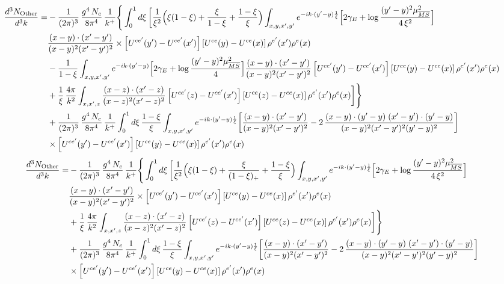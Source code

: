 \documentclass[9pt]{article}
\numberwithin{equation}{section}
\begin{document}
\begin{align}
\frac{d^{3}N_{\rm Other}}{d^{3}k}= &-\frac{1}{(2\pi)^{3}}\,\frac{g^{4}\,N_{c}}{8\pi^{4}}\,\frac{1}{k^{+}}\Bigg\{\int_{0}^{1}d\xi\,\bigg[\frac{1}{\xi^{2}}\Big(\xi(1-\xi)+\frac{\xi}{1-\xi}+\frac{1-\xi}{\xi}\Big)\int_{x,y,x',y'}e^{-ik\cdot(y'-y)\frac{1}{\xi}}\Big[2\gamma_{E}+\log\frac{(y'-y)^{2}\mu^{2}_{\overline{MS}}}{4\,\xi^{2}}\Big]\notag \\ & \frac{(x-y)\cdot(x'-y')}{(x-y)^{2}(x'-y')^{2}}\times\left[U^{ce'}(y') - U^{ce'}(x')\right]\left[U^{ce}(y) - U^{ce}(x)\right]\rho^{e'}(x')\rho^{e}(x)\notag\\
&-\frac{1}{1-\xi}\int_{x,y,x',y'}e^{-ik\cdot(y'-y)}\Big[2\gamma_{E}+\log\frac{(y'-y)^{2}\mu^{2}_{\overline{MS}}}{4}\Big]\frac{(x-y)\cdot(x'-y')}{(x-y)^{2}(x'-y')^{2}}\left[U^{ce'}(y') - U^{ce'}(x')\right]\left[U^{ce}(y) - U^{ce}(x)\right]\rho^{e'}(x')\rho^{e}(x)\notag\\
&+\frac{1}{\xi}\,\frac{4\pi}{k^{2}}\int_{x,x',z}\frac{(x-z)\cdot(x'-z)}{(x-z)^{2}(x'-z)^{2}}\left[U^{ce'}(z) - U^{ce'}(x')\right]\left[U^{ce}(z) - U^{ce}(x)\right]\rho^{e'}(x')\rho^{e}(x)\bigg]\Bigg\}\notag\\
&+\frac{1}{(2\pi)^{3}}\,\frac{g^{4}\,N_{c}}{8\pi^{4}}\,\frac{1}{k^{+}}\int_{0}^{1}d\xi\,\frac{1-\xi}{\xi}\int_{x,y,x',y'}e^{-ik\cdot(y'-y)\frac{1}{\xi}}\bigg[\frac{(x-y)\cdot(x'-y')}{(x-y)^{2}(x'-y')^{2}}-2\,\frac{(x-y)\cdot(y'-y)\;(x'-y')\cdot(y'-y)}{(x-y)^{2}(x'-y')^{2}(y'-y)^{2}}\bigg]\notag\\
&\times\left[U^{ce'}(y') - U^{ce'}(x')\right]\left[U^{ce}(y) - U^{ce}(x)\right]\rho^{e'}(x')\rho^{e}(x)
\end{align}
\begin{align}
\frac{d^{3}N_{\rm Other}}{d^{3}k}= &-\frac{1}{(2\pi)^{3}}\,\frac{g^{4}\,N_{c}}{8\pi^{4}}\,\frac{1}{k^{+}}\Bigg\{\int_{0}^{1}d\xi\,\bigg[\frac{1}{\xi^{2}}\Big(\xi(1-\xi)+\frac{\xi}{(1-\xi)_{+}}+\frac{1-\xi}{\xi}\Big)\int_{x,y,x',y'}e^{-ik\cdot(y'-y)\frac{1}{\xi}}\Big[2\gamma_{E}+\log\frac{(y'-y)^{2}\mu^{2}_{\overline{MS}}}{4\,\xi^{2}}\Big]\notag \\ & \frac{(x-y)\cdot(x'-y')}{(x-y)^{2}(x'-y')^{2}}\times\left[U^{ce'}(y') - U^{ce'}(x')\right]\left[U^{ce}(y) - U^{ce}(x)\right]\rho^{e'}(x')\rho^{e}(x)\notag\\
&+\frac{1}{\xi}\,\frac{4\pi}{k^{2}}\int_{x,x',z}\frac{(x-z)\cdot(x'-z)}{(x-z)^{2}(x'-z)^{2}}\left[U^{ce'}(z) - U^{ce'}(x')\right]\left[U^{ce}(z) - U^{ce}(x)\right]\rho^{e'}(x')\rho^{e}(x)\bigg]\Bigg\}\notag\\
&+\frac{1}{(2\pi)^{3}}\,\frac{g^{4}\,N_{c}}{8\pi^{4}}\,\frac{1}{k^{+}}\int_{0}^{1}d\xi\,\frac{1-\xi}{\xi}\int_{x,y,x',y'}e^{-ik\cdot(y'-y)\frac{1}{\xi}}\bigg[\frac{(x-y)\cdot(x'-y')}{(x-y)^{2}(x'-y')^{2}}-2\,\frac{(x-y)\cdot(y'-y)\;(x'-y')\cdot(y'-y)}{(x-y)^{2}(x'-y')^{2}(y'-y)^{2}}\bigg]\notag\\
&\times\left[U^{ce'}(y') - U^{ce'}(x')\right]\left[U^{ce}(y) - U^{ce}(x)\right]\rho^{e'}(x')\rho^{e}(x)
\end{align}
\end{document}
